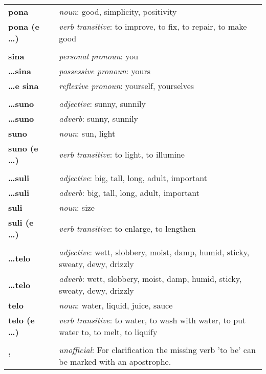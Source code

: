 \begin{supertabular}{p{2,5cm}|ll}
\textbf{pona} && \textit{noun}: good, simplicity, positivity \\ %
\textbf{pona (e \dots)} && \textit{verb transitive}: to improve, to fix, to repair, to make good \\ %
 && \\ %
\textbf{sina} && \textit{personal pronoun}: you \\ %
\textbf{\dots sina} && \textit{possessive pronoun}: yours \\  %
\textbf{\dots e sina} && \textit{reflexive pronoun}: yourself, yourselves \\  
 && \\ %
\textbf{\dots suno} && \textit{adjective}: sunny, sunnily \\ %
\textbf{\dots suno} && \textit{adverb}: sunny, sunnily \\ %
\textbf{suno} && \textit{noun}: sun, light \\ %
\textbf{suno (e \dots)} && \textit{verb transitive}: to light, to illumine \\ %
 && \\ %
\textbf{\dots suli} && \textit{adjective}: big, tall, long, adult, important \\ %
\textbf{\dots suli} && \textit{adverb}: big, tall, long, adult, important \\ %
\textbf{suli} && \textit{noun}: size \\ %
\textbf{suli (e \dots)} && \textit{verb transitive}: to enlarge, to lengthen \\ %
 && \\ %
\textbf{\dots telo} && \textit{adjective}: wett, slobbery, moist, damp, humid, sticky, sweaty, dewy, drizzly \\ %
\textbf{\dots telo} && \textit{adverb}: wett, slobbery, moist, damp, humid, sticky, sweaty, dewy, drizzly \\ %
\textbf{telo} && \textit{noun}: water, liquid, juice, sauce \\ %
\textbf{telo (e \dots)} && \textit{verb transitive}: to water, to wash with water, to put water to, to melt, to liquify \\ %
 && \\ %
\textbf{'} && \textit{unofficial}: For clarification the missing verb 'to be' can be marked with an apostrophe.  \\ %
\end{supertabular} \\
%
\newpage
